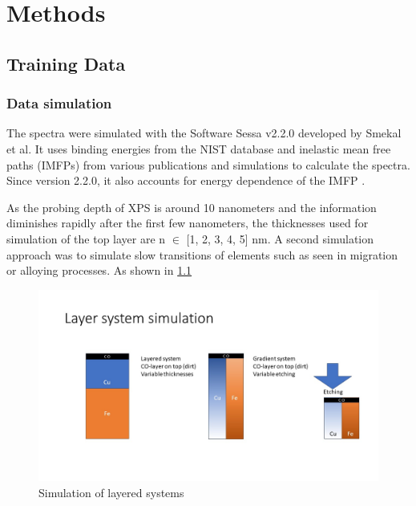 


\chapter{Methods} %

\label{Chapter3} %


\section{Training Data}



\subsection{Data simulation}

The spectra were simulated with the Software Sessa v2.2.0 developed by Smekal et al. It uses binding energies from the NIST database and inelastic mean free paths (IMFPs) from various publications and simulations to calculate the spectra. Since version 2.2.0, it also accounts for energy dependence of the IMFP \cite{noauthor_nist_2010}.

As the probing depth of XPS is around 10 nanometers and the information diminishes rapidly after the first few nanometers, the thicknesses used for simulation of the top layer are n $\in$ [1, 2, 3, 4, 5] nm. A second simulation approach was to simulate slow transitions of elements such as seen in migration or alloying processes. As shown in \ref{fig:layers}

\begin{figure}
    \centering
    \includegraphics[scale=0.4]{Figures/Layers.jpg}
    \caption{Simulation of layered systems}
    \label{fig:layers}
\end{figure}


